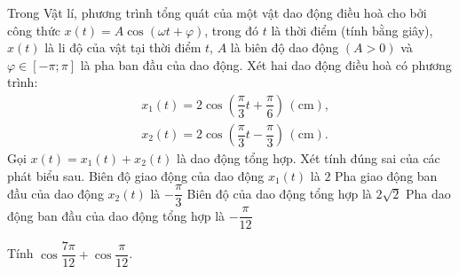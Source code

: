 \begin{ex}%
	Trong Vật lí, phương trình tổng quát của một vật dao động điều hoà cho bởi công thức $x(t)=A \cos (\omega t+\varphi)$, trong đó $t$ là thời điểm (tính bằng giây), $x(t)$ là li độ của vật tại thời điểm $t$, $A$ là biên độ dao động $(A>0)$ và $\varphi \in[-\pi ; \pi]$ là pha ban đầu của dao động. Xét hai dao động điều hoà có phương trình:
	$$
	\begin{aligned}
	& x_1(t)=2 \cos \left(\dfrac{\pi}{3} t+\dfrac{\pi}{6}\right)\,(\mathrm{cm}), \\
	& x_2(t)=2 \cos \left(\dfrac{\pi}{3} t-\dfrac{\pi}{3}\right)\,(\mathrm{cm}).
	\end{aligned}
	$$
	Gọi $x(t)=x_1(t)+x_2(t)$ là dao động tổng hợp. Xét tính đúng sai của các phát biểu sau.
	\choiceTF
	{\True Biên độ giao động của dao động $x_1(t)$ là $2$}
	{\True Pha giao động ban đầu của dao động $x_2(t)$ là $-\dfrac{\pi}{3}$}
	{\True Biên độ của dao động tổng hợp là $2\sqrt{2}$}
	{\True Pha dao động ban đầu của dao động tổng hợp là $-\dfrac{\pi}{12}$}
\end{ex}

\begin{bt}%
	Tính $\cos \dfrac{7 \pi}{12} + \cos \dfrac{\pi}{12}$.
\end{bt}

